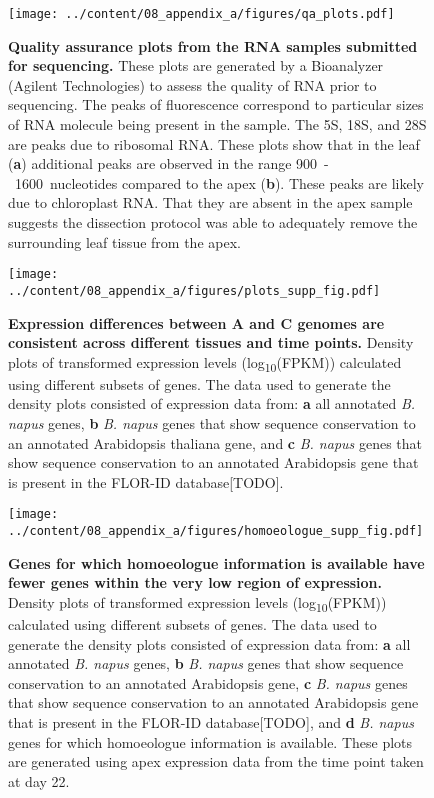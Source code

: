\documentclass[12pt,]{book}
\begin{document}
\begin{figure}[htbp]
\centering
\texttt{[image: ../content/08\_appendix\_a/figures/qa\_plots.pdf]}
\caption{\textbf{Quality assurance plots from the RNA samples submitted
for sequencing.} These plots are generated by a Bioanalyzer (Agilent
Technologies) to assess the quality of RNA prior to sequencing. The
peaks of fluorescence correspond to particular sizes of RNA molecule
being present in the sample. The 5S, 18S, and 28S are peaks due to
ribosomal RNA. These plots show that in the leaf (\textbf{a}) additional
peaks are observed in the range 900~-~1600~nucleotides compared to the
apex (\textbf{b}). These peaks are likely due to chloroplast RNA. That
they are absent in the apex sample suggests the dissection protocol was
able to adequately remove the surrounding leaf tissue from the
apex.}\label{appendixa:qaplots}
\end{figure}

\begin{figure}[htbp]
\centering
\texttt{[image: ../content/08\_appendix\_a/figures/plots\_supp\_fig.pdf]}
\caption{\textbf{Expression differences between A and C genomes are
consistent across different tissues and time points.} Density plots of
transformed expression levels (log\textsubscript{10}(FPKM)) calculated
using different subsets of genes. The data used to generate the density
plots consisted of expression data from: \textbf{a} all annotated
\emph{B. napus} genes, \textbf{b} \emph{B. napus} genes that show
sequence conservation to an annotated Arabidopsis thaliana gene, and
\textbf{c} \emph{B. napus} genes that show sequence conservation to an
annotated Arabidopsis gene that is present in the FLOR-ID
database{[}TODO{]}.}\label{appendixa:sampledensity}
\end{figure}

\begin{figure}[htbp]
\centering
\texttt{[image: ../content/08\_appendix\_a/figures/homoeologue\_supp\_fig.pdf]}
\caption{\textbf{Genes for which homoeologue information is available
have fewer genes within the very low region of expression.} Density
plots of transformed expression levels (log\textsubscript{10}(FPKM))
calculated using different subsets of genes. The data used to generate
the density plots consisted of expression data from: \textbf{a} all
annotated \emph{B. napus} genes, \textbf{b} \emph{B. napus} genes that
show sequence conservation to an annotated Arabidopsis gene, \textbf{c}
\emph{B. napus} genes that show sequence conservation to an annotated
Arabidopsis gene that is present in the FLOR-ID database{[}TODO{]}, and
\textbf{d} \emph{B. napus} genes for which homoeologue information is
available. These plots are generated using apex expression data from the
time point taken at day 22.}\label{appendixa:homoeologuedensity}
\end{figure}
\end{document}

